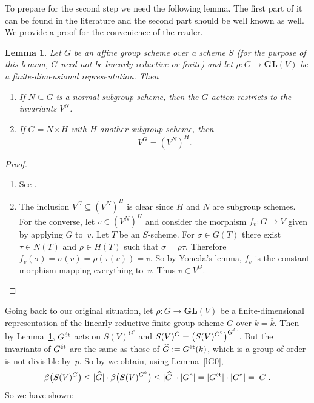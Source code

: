 \documentclass[reqno]{amsart}
\newcommand{\GL}{{\mathbf{GL}}}
\newcommand{\et}{{\rm \acute{e}t}}
\theoremstyle{definition}
\theoremstyle{plain}
\newtheorem{Lemma}[Definition]{Lemma}
\begin{document}
To prepare for the second step we need the following lemma. The first
part of it can be found in the literature and the second part
should be well known as well. We provide a proof for the convenience of the
reader.

\begin{Lemma} \label{lGN}%
  Let $G$ be an affine group scheme over a scheme $S$ (for the purpose
  of this lemma, $G$ need not be linearly reductive or finite) and let
  $\rho:G\to\GL(V)$ be a finite-dimensional representation. Then
  \begin{enumerate}[label=(\alph*)]
  \item \label{lGNA} If $N \subseteq G$ is a normal subgroup scheme, then the
    $G$-action restricts to the invariants $V^N$.
  \item \label{lGNB} If $G = N \rtimes H$ with $H$ another subgroup scheme, then
    \[
      V^G = (V^N)^H.
    \]
  \end{enumerate}
\end{Lemma}

\begin{proof}
  \begin{enumerate}
  \item[\ref{lGNA}] 
    See \cite[Lemma~16.3]{Waterhouse}.
  \item[\ref{lGNB}] The inclusion $V^G \subseteq (V^N)^H$ is clear since $H$
    and $N$ are subgroup schemes. For the converse, let
    $v \in (V^N)^H$ and consider the morphism $f_v: G \to V$ given by
    applying $G$ to~$v$. Let $T$ be an $S$-scheme. For
    $\sigma \in G(T)$ there exist $\tau \in N(T)$ and $\rho \in H(T)$
    such that $\sigma = \rho \tau$. Therefore
    $f_v(\sigma) = \sigma(v) = \rho(\tau(v)) = v$. So by Yoneda's
    lemma, $f_v$ is the constant morphism mapping everything to~$v$.
    Thus $v \in V^G$. \endproof
  \end{enumerate}
\end{proof}

Going back to our original situation, let $\rho : G \to \GL(V)$ be a finite-dimensional
representation of the linearly reductive finite group scheme $G$ over $k = \bar k$. Then
by Lemma~\ref{lGN}, $G^\et$ acts on $S(V)^{G^\circ}$ and
$S(V)^G = \bigl(S(V)^{G^\circ}\bigr)^{G^\et}$. But the
invariants of $G^\et$ are the same as those of
$\widehat G := G^\et(k)$, which is a group of order is not
divisible by~$p$. So by \cite[Theorem~3.22]{DK} we obtain, using
Lemma~\ref{lG0},
\[
  \beta\bigl(S(V)^G\bigr) \le |\widehat G| \cdot
\beta\bigl(S(V)^{G^\circ}\bigr) \le |\widehat G| \cdot |G^\circ| =
|G^\et| \cdot |G^\circ| = |G|.
\]
So we have shown:
\end{document}
